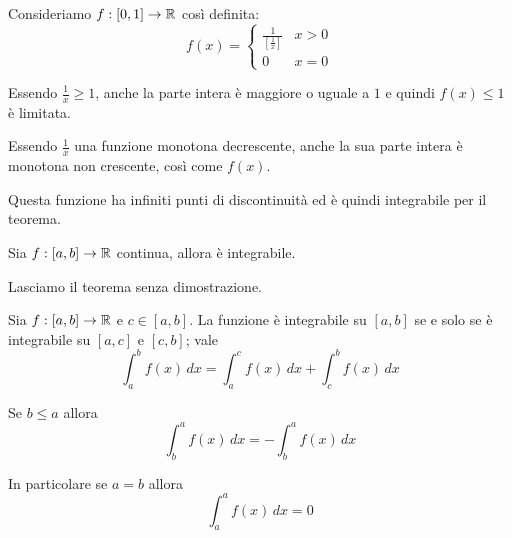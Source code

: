 \begin{example}
Consideriamo $f:[0,1] \to \mathbb R$ così definita:
\begin{equation*}
f(x) = \begin{cases}
\frac{1}{[\frac{1}{x}]} & x > 0 \\
0 & x = 0
\end{cases}
\end{equation*}

Essendo $\frac{1}{x} \ge 1$, anche la parte intera è maggiore o uguale a $1$ e quindi $f(x) \le 1$ è limitata.

Essendo $\frac{1}{x}$ una funzione monotona decrescente, anche la sua parte intera è monotona non crescente, così come $f(x)$.

Questa funzione ha infiniti punti di discontinuità ed è quindi integrabile per il teorema.
\end{example}

\begin{theorem}
Sia $f:[a,b] \to \mathbb R$ continua, allora è integrabile.
\end{theorem}

Lasciamo il teorema senza dimostrazione.

\begin{proposition}
Sia $f:[a,b] \to \mathbb R$ e $c \in [a,b]$. La funzione è integrabile su $[a,b]$ se e solo se è integrabile su $[a,c]$ e $[c,b]$; vale
\begin{equation*}
\int_a^b f(x) \, dx = \int_a^c f(x) \, dx + \int_c^b f(x) \, dx
\end{equation*}
\end{proposition}

\begin{definition}
Se $b \le a$ allora
\begin{equation*}
\int^a_b f(x) \, dx = - \int_b^a f(x) \, dx
\end{equation*}

In particolare se $a = b$ allora
\begin{equation*}
\int_a^a f(x) \, dx = 0
\end{equation*}
\end{definition}